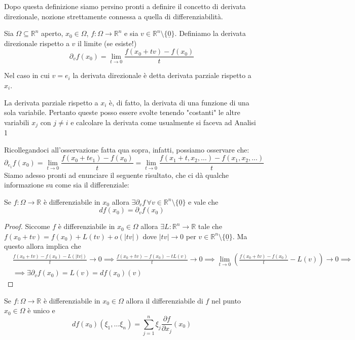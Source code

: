 \documentclass[openany]{book}
\begin{document}
Dopo questa definizione siamo persino pronti a definire il concetto di derivata direzionale, nozione strettamente connessa a quella di differenziabilità.
\begin{definition}
Sia $\Omega \subseteq \mathbb{R}^n$ aperto, $x_0 \in \Omega$, $f: \Omega \to \mathbb{R}^n$ e sia $v \in \mathbb{R}^n \setminus \{ \underline{0} \}$. Definiamo la derivata direzionale rispetto a $v$ il limite (se esiste!)
$$
\partial_v f(x_0) = \lim_{t \to 0} \frac{f(x_0 + tv) - f(x_0)}{t}
$$
\end{definition}
\noindent Nel caso in cui $v = e_i$ la derivata direzionale è detta derivata parziale rispetto a $x_i$.
\begin{remark}
La derivata parziale rispetto a $x_i$ è, di fatto, la derivata di una funzione di una sola variabile. Pertanto queste posso essere svolte tenendo "costanti" le altre variabili $x_j$ con $j \neq i$ e calcolare la derivata come usualmente si faceva ad Analisi 1
\end{remark}
\noindent Ricollegandoci all'osservazione fatta qua sopra, infatti, possiamo osservare che:
$$
\partial_{e_1} f(x_0) = \lim_{t \to 0} \frac{f(x_0 + te_1) - f(x_0)}{t} = \lim_{t \to 0} \frac{f(x_1 + t, x_2, \ldots) - f(x_1, x_2, \ldots )}{t}
$$
Siamo adesso pronti ad enunciare il seguente risultato, che ci dà qualche informazione su come sia il differenziale:
\begin{theorem}[teorema DF1]
Se $f: \Omega \to \mathbb{R}$ è differenziabile in $x_0$ allora $\exists \partial_v f \, \forall v \in \mathbb{R}^n \setminus \{ \underline{0} \}$ e vale che
$$
df(x_0) = \partial_v f(x_0)
$$
\end{theorem}
\begin{proof}
Siccome $f$ è differenziabile in $x_0 \in \Omega$ allora $\exists L: \mathbb{R}^n \to \mathbb{R}$ tale che $f(x_0 + tv) = f(x_0) + L(tv) + o(|tv|)$ dove $|tv| \to 0$ per $v \in \mathbb{R}^n \setminus \{ \underline{0} \}$. Ma questo allora implica che
\begin{align*}
&\frac{f(x_0 + tv) - f(x_0) - L(|tv|)}{t} \to 0 \implies \frac{f(x_0 + tv) - f(x_0) - tL(v)}{t} \to 0 \implies \lim_{t \to 0} (\frac{f(x_0 + tv) - f(x_0)}{t} - L(v)) \to 0 \implies \\ &\implies \exists \partial_v f(x_0) = L(v) = df(x_0)(v)
\end{align*}
\end{proof}
\begin{theorem}
Se $f: \Omega \to \mathbb{R}$ è differenziabile in $x_0 \in \Omega$  allora il differenziabile di $f$ nel punto $x_0 \in \Omega$ è unico e
$$
df(x_0)(\xi_1, \ldots \xi_n) = \sum_{j=1}^n \xi_j \frac{\partial f}{\partial x_j}(x_0)
$$
\end{theorem}
\end{document}
